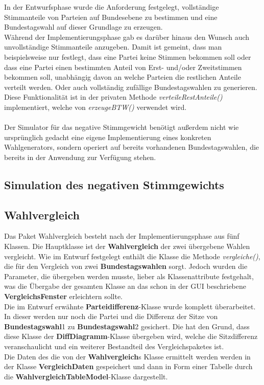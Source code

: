 \documentclass[12pt,a4paper,titlepage]{article}
\newcommand{\myma}{\fontfamily{pcr}\selectfont \textbf}
\newcommand{\mymo}{\fontfamily{pcr}\selectfont \textit}
\begin{document}
In der Entwurfsphase wurde die Anforderung festgelegt, vollständige Stimmanteile von Parteien auf Bundesebene zu bestimmen und eine Bundestagswahl auf dieser Grundlage zu erzeugen.\\
Während der Implementierungsphase gab es darüber hinaus den Wunsch auch unvollständige Stimmanteile anzugeben. Damit ist gemeint, dass man beispielsweise nur festlegt, dass eine Partei keine Stimmen bekommen soll oder dass eine Partei einen bestimmten Anteil von Erst- und/oder Zweitstimmen bekommen soll, unabhängig davon an welche Parteien die restlichen Anteile verteilt werden. Oder auch vollständig zufällige Bundestagswahlen zu generieren. Diese Funktionalität ist in der privaten Methode {\mymo{verteileRestAnteile()}} implementiert, welche von {\mymo{erzeugeBTW()}} verwendet wird.\\\\

Der Simulator für das negative Stimmgewicht benötigt außerdem nicht wie ursprünglich gedacht eine eigene Implementierung eines konkreten Wahlgenerators, sondern operiert auf bereits vorhandenen Bundestagswahlen, die bereits in der Anwendung zur Verfügung stehen.

	\subsection{Simulation des negativen Stimmgewichts}
		
\subsection{Wahlvergleich}
Das Paket Wahlvergleich besteht nach der Implementierungsphase aus fünf Klassen. Die Hauptklasse ist der {\myma{Wahlvergleich}} der zwei übergebene Wahlen vergleicht. Wie im Entwurf festgelegt enthält die Klasse die Methode {\mymo{vergleiche()}}, die für den Vergleich von zwei {\myma{Bundestagswahlen}} sorgt. Jedoch wurden die Parameter, die übergeben werden musste, lieber als Klassenattribute festgehalt, was die Übergabe der gesamten Klasse an das schon in der GUI beschriebene {\myma{VergleichsFenster}} erleichtern sollte. \\
Die im Entwurf erwähnte {\myma{Parteidifferenz}}-Klasse wurde komplett überarbeitet. In dieser werden nur noch die Partei und die Differenz der Sitze von {\myma{Bundestagswahl}}1 zu {\myma{Bundestagswahl}}2 gesichert. Die hat den Grund, dass diese Klasse der {\myma{DiffDiagramm}}-Klasse übergeben wird, welche die Sitzdifferenz veranschaulicht und ein weiterer Bestandteil des Vergleichspaketes ist. \\
Die Daten des die von der {\myma{Wahlvergleich}}s Klasse ermittelt werden werden in der Klasse {\myma{VergleichDaten}} gespeichert und dann in Form einer Tabelle durch die {\myma{WahlvergleichTableModel}}-Klasse dargestellt. 
	
\end{document}
